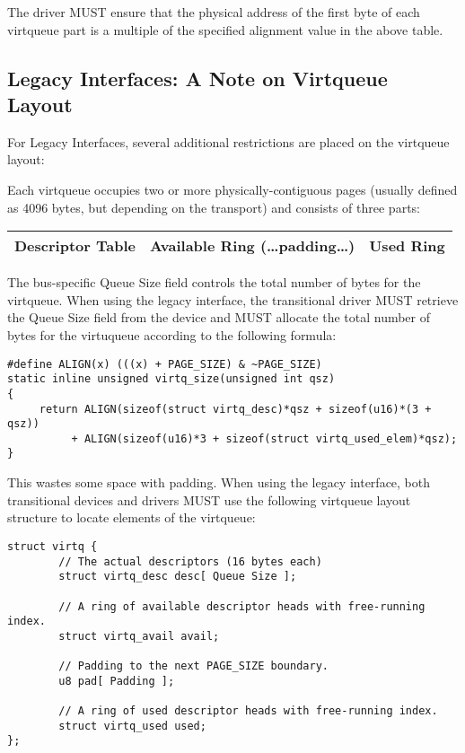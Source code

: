 The driver MUST ensure that the physical address of the first byte
of each virtqueue part is a multiple of the specified alignment value
in the above table.

\subsection{Legacy Interfaces: A Note on Virtqueue Layout}\label{sec:Basic Facilities of a Virtio Device / Virtqueues / Legacy Interfaces: A Note on Virtqueue Layout}

For Legacy Interfaces, several additional
restrictions are placed on the virtqueue layout:

Each virtqueue occupies two or more physically-contiguous pages
(usually defined as 4096 bytes, but depending on the transport)
and consists of three parts:

\begin{tabular}{|l|l|l|}
\hline
Descriptor Table & Available Ring (\ldots padding\ldots) & Used Ring \\
\hline
\end{tabular}

The bus-specific Queue Size field controls the total number of bytes
for the virtqueue.
When using the legacy interface, the transitional
driver MUST retrieve the Queue Size field from the device
and MUST allocate the total number of bytes for the virtuqueue
according to the following formula:

\begin{lstlisting}
#define ALIGN(x) (((x) + PAGE_SIZE) & ~PAGE_SIZE)
static inline unsigned virtq_size(unsigned int qsz)
{
     return ALIGN(sizeof(struct virtq_desc)*qsz + sizeof(u16)*(3 + qsz))
          + ALIGN(sizeof(u16)*3 + sizeof(struct virtq_used_elem)*qsz);
}
\end{lstlisting}

This wastes some space with padding.
When using the legacy interface, both transitional
devices and drivers MUST use the following virtqueue layout
structure to locate elements of the virtqueue:

\begin{lstlisting}
struct virtq {
        // The actual descriptors (16 bytes each)
        struct virtq_desc desc[ Queue Size ];

        // A ring of available descriptor heads with free-running index.
        struct virtq_avail avail;

        // Padding to the next PAGE_SIZE boundary.
        u8 pad[ Padding ];

        // A ring of used descriptor heads with free-running index.
        struct virtq_used used;
};
\end{lstlisting}


